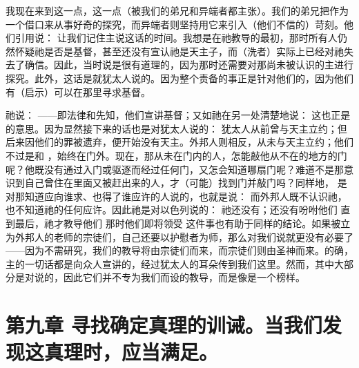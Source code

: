 我现在来到这一点，这一点（被我们的弟兄和异端者都主张）。我们的弟兄把作为一个借口来从事好奇的探究，而异端者则坚持用它来引入（他们不信的）苛刻。他们引用说： 让我们记住主说这话的时间。我想是在祂教导的最初，那时所有人仍然怀疑祂是否是基督，甚至还没有宣认祂是天主子，而（洗者）实际上已经对祂失去了确信。因此，当时说是很有道理的，因为那时还需要对那尚未被认识的主进行探究。此外，这话是就犹太人说的。因为整个责备的事正是针对他们的，因为他们有（启示）可以在那里寻求基督。\par

祂说：  ——即法律和先知，他们宣讲基督；又如祂在另一处清楚地说：  这也正是的意思。因为显然接下来的话也是对犹太人说的：  犹太人从前曾与天主立约；但后来因他们的罪被遗弃，便开始没有天主。外邦人则相反，从未与天主立约；他们不过是和 ，始终在门外。现在，那从未在门内的人，怎能敲他从不在的地方的门呢？他既没有通过入门或驱逐而经过任何门，又怎会知道哪扇门呢？难道不是那意识到自己曾住在里面又被赶出来的人，才（可能）找到门并敲门吗？同样地，  是对那知道应向谁求、也得了谁应许的人说的，也就是说： 而外邦人既不认识祂，也不知道祂的任何应许。因此祂是对以色列说的：  祂还没有；还没有吩咐他们  直到最后，祂才教导他们  那时他们即将领受  这件事也有助于同样的结论。如果被立为外邦人的老师的宗徒们，自己还要以护慰者为师，那么对我们说就更没有必要了——因为不需研究，我们的教导将由宗徒们而来，而宗徒们则由圣神而来。的确，主的一切话都是向众人宣讲的，经过犹太人的耳朵传到我们这里。然而，其中大部分是对说的，因此它们并不专为我们而设的教导，而是像是一个榜样。\par


\section{第九章 寻找确定真理的训诫。当我们发现这真理时，应当满足。}

